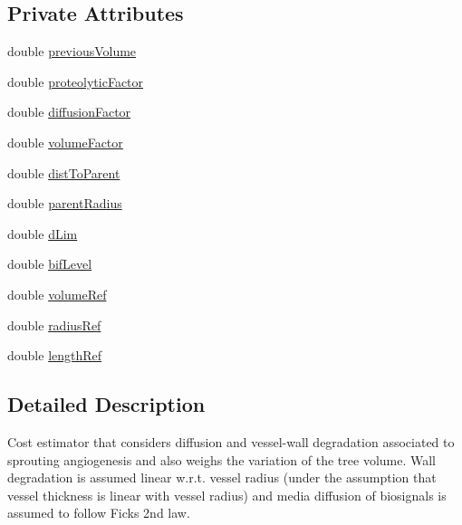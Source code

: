 \subsection*{Private Attributes}
\begin{DoxyCompactItemize}
\item 
double \hyperlink{class_adim_sprouting_volumetric_cost_estimator_abcacf4498f7210da6ff4f04cca3ab176}{previous\+Volume}
\item 
double \hyperlink{class_adim_sprouting_volumetric_cost_estimator_ab8b8bfa47fa1e8283e9b1d9721d7cf29}{proteolytic\+Factor}
\item 
double \hyperlink{class_adim_sprouting_volumetric_cost_estimator_a1a4df5f80756f1559f76b8e980e48cf7}{diffusion\+Factor}
\item 
double \hyperlink{class_adim_sprouting_volumetric_cost_estimator_a1d1ad71ae3bf8c56867108d30eba8091}{volume\+Factor}
\item 
double \hyperlink{class_adim_sprouting_volumetric_cost_estimator_aab34b0032a1dd58352bce32596c6925c}{dist\+To\+Parent}
\item 
double \hyperlink{class_adim_sprouting_volumetric_cost_estimator_aecf10c7e6f390a23a1c6efdde6860a09}{parent\+Radius}
\item 
double \hyperlink{class_adim_sprouting_volumetric_cost_estimator_a1b79ece84388a541810e55879ee99d8a}{d\+Lim}
\item 
double \hyperlink{class_adim_sprouting_volumetric_cost_estimator_a04c0ad4a538a899e3b308a817348ce0f}{bif\+Level}
\item 
double \hyperlink{class_adim_sprouting_volumetric_cost_estimator_ac04ce5ad212cc71e3de3c3d3563217a2}{volume\+Ref}
\item 
double \hyperlink{class_adim_sprouting_volumetric_cost_estimator_a8d3cdcd6ecf322c066cd6042279af68c}{radius\+Ref}
\item 
double \hyperlink{class_adim_sprouting_volumetric_cost_estimator_a10b777646a17f717f48d81287f01863d}{length\+Ref}
\end{DoxyCompactItemize}


\subsection{Detailed Description}
Cost estimator that considers diffusion and vessel-\/wall degradation associated to sprouting angiogenesis and also weighs the variation of the tree volume. Wall degradation is assumed linear w.\+r.\+t. vessel radius (under the assumption that vessel thickness is linear with vessel radius) and media diffusion of biosignals is assumed to follow Fick\textquotesingle{}s 2nd law. 

